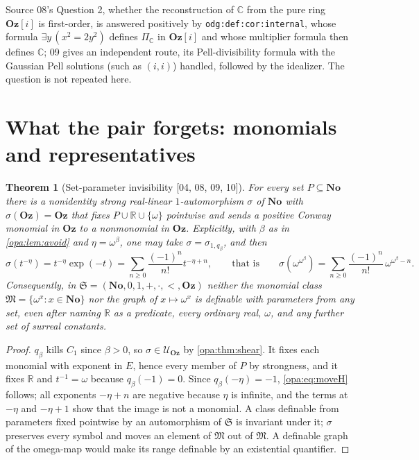 \documentclass[11pt,oneside]{article}
\numberwithin{equation}{section}
\newtheorem{theorem}{Theorem}[section]
\theoremstyle{definition}
\theoremstyle{remark}
\newcommand{\No}{\mathbf{No}}
\newcommand{\Oz}{\mathbf{Oz}}
\newcommand{\Og}{\mathbf{Oz}[i]}
\newcommand{\R}{\mathbb R}
\newcommand{\C}{\mathbb C}
\newcommand{\UU}{\mathcal U}
\newcommand{\Mon}{\mathfrak M}
\newcommand{\src}[1]{\textup{\textsf{\small[#1]}}}
\newcommand{\lbl}[1]{\nolinkurl{#1}}
\begin{document}
Source 08's Question 2, whether the reconstruction of $\C$ from the pure ring
$\Og$ is first-order, is answered positively by \lbl{odg:def:cor:internal}, whose
formula $\exists y\,(x^2=2y^2)$ defines $\Pi_\C$ in $\Og$ and whose multiplier
formula then defines $\C$; 09 gives an independent route, its Pell-divisibility
formula with the Gaussian Pell solutions (such as $(i,i)$) handled, followed by
the idealizer. The question is not repeated here.

\section{What the pair forgets: monomials and representatives}\label{opa:sec:nondef}

\begin{theorem}[Set-parameter invisibility \src{04, 08, 09, 10}]\label{opa:thm:parameters}
For every set $P\subseteq\No$ there is a nonidentity strong real-linear
$1$-automorphism $\sigma$ of $\No$ with $\sigma(\Oz)=\Oz$ that fixes
$P\cup\R\cup\{\omega\}$ pointwise and sends a positive Conway monomial in $\Oz$ to a
nonmonomial in $\Oz$. Explicitly, with $\beta$ as in \cref{opa:lem:avoid} and
$\eta=\omega^\beta$, one may take $\sigma=\sigma_{1,q_\beta}$, and then
\begin{equation}\label{opa:eq:moveH}
 \sigma(t^{-\eta})=t^{-\eta}\exp(-t)=\sum_{n\ge0}\frac{(-1)^n}{n!}t^{-\eta+n},
 \qquad\text{that is}\qquad
 \sigma(\omega^{\omega^\beta})=\sum_{n\ge0}\frac{(-1)^n}{n!}\,\omega^{\omega^\beta-n}.
\end{equation}
Consequently, in $\mathfrak S=(\No,0,1,+,\cdot,<,\Oz)$ neither the monomial class
$\Mon=\{\omega^x:x\in\No\}$ nor the graph of $x\mapsto\omega^x$ is definable with
parameters from any set, even after naming $\R$ as a predicate, every ordinary
real, $\omega$, and any further set of surreal constants.
\end{theorem}
\begin{proof}
$q_\beta$ kills $C_1$ since $\beta>0$, so $\sigma\in\UU_\Oz$ by \cref{opa:thm:shear}. It
fixes each monomial with exponent in $E$, hence every member of $P$ by strongness,
and it fixes $\R$ and $t^{-1}=\omega$ because $q_\beta(-1)=0$. Since
$q_\beta(-\eta)=-1$, \eqref{opa:eq:moveH} follows; all exponents $-\eta+n$ are negative
because $\eta$ is infinite, and the terms at $-\eta$ and $-\eta+1$ show that the image
is not a monomial. A class definable from parameters fixed pointwise by an
automorphism of $\mathfrak S$ is invariant under it; $\sigma$ preserves every symbol
and moves an element of $\Mon$ out of $\Mon$. A definable graph of the omega-map
would make its range definable by an existential quantifier.
\end{proof}
\end{document}
